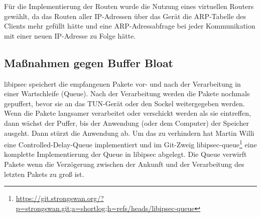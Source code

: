 Für die Implementierung der Routen wurde die Nutzung eines virtuellen Routers gewählt,
da das Routen aller \ac{IP}-Adressen über das Gerät die \ac{ARP}-Tabelle des Clients
mehr gefüllt hätte und eine \ac{ARP}-Adressabfrage bei jeder Kommunikation mit einer neuen
\ac{IP}-Adresse zu Folge hätte.

\subsection{Maßnahmen gegen Buffer Bloat}
libipsec speichert die empfangenen Pakete vor- und nach der Verarbeitung in einer 
Wartschleife (Queue).
Nach der Verarbeitung werden die Pakete nochmals gepuffert, bevor sie an das TUN-Gerät 
oder den Sockel
weitergegeben werden. Wenn die Pakete langsamer verarbeitet oder verschickt werden 
als sie eintreffen,
dann wächst der Puffer, bis der Anwendung (oder dem Computer) der Speicher ausgeht. 
Dann stürzt die Anwendung ab.
Um das zu verhindern hat Martin Willi eine Controlled-Delay-Queue implementiert und 
im Git-Zweig libipsec-queue\footnote{\url{https://git.strongswan.org/?p=strongswan.git;a=shortlog;h=refs/heads/libipsec-queue}} 
eine komplette Implementierung der Queue in libipsec abgelegt.
Die Queue verwirft Pakete wenn die Verzögerung zwischen der Ankunft und der Verarbeitung
des letzten Pakets zu groß ist.
